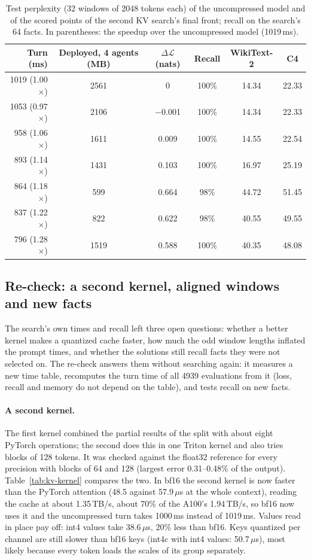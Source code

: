 \documentclass[11pt]{article}
\newcommand{\dloss}{\Delta\mathcal{L}}
\newcommand{\us}{\,$\mu$s}
\begin{document}
\begin{table}[htbp]
\centering
\small
\begin{tabular}{rccccc}
\toprule
Turn (ms) & Deployed, 4 agents (MB) & $\dloss$ (nats) & Recall & WikiText-2 & C4 \\
\midrule
 1019 (1.00$\times$) & 2561 & 0       & 100\% & 14.34 & 22.33 \\
\midrule
 1053 (0.97$\times$) & 2106 & $-$0.001 & 100\% & 14.34 & 22.33 \\
 958 (1.06$\times$) & 1611 & 0.009   & 100\% & 14.55 & 22.54 \\
 893 (1.14$\times$) & 1431 & 0.103   & 100\% & 16.97 & 25.19 \\
 864 (1.18$\times$) &  599 & 0.664   & 98\%  & 44.72 & 51.45 \\
 837 (1.22$\times$) &  822 & 0.622   & 98\%  & 40.55 & 49.55 \\
 796 (1.28$\times$) & 1519 & 0.588   & 100\% & 40.35 & 48.08 \\
\bottomrule
\end{tabular}
\caption{Test perplexity (32 windows of 2048 tokens each) of the uncompressed model and of the scored points
of the second KV search's final front; recall on the search's 64 facts. In parentheses: the speedup over the uncompressed model (1019\,ms).}
\label{tab:kv2-test}
\end{table}

\subsection{Re-check: a second kernel, aligned windows and new facts}
\label{sec:kv-recheck}
The search's own times and recall left three open questions: whether a better kernel makes a quantized
cache faster, how much the odd window lengths inflated the prompt times, and whether the solutions still
recall facts they were not selected on. The re-check answers them without searching again: it measures a
new time table, recomputes the turn time of all 4939 evaluations from it (loss, recall and memory do not
depend on the table), and tests recall on new facts.

\paragraph{A second kernel.} The first kernel combined the partial results of the split with about eight
PyTorch operations; the second does this in one Triton kernel and also tries blocks of 128 tokens. It was
checked against the float32 reference for every precision with blocks of 64 and 128 (largest error
0.31--0.48\% of the output). Table~\ref{tab:kv-kernel} compares the two. In bf16 the second kernel is now
faster than the PyTorch attention (48.5 against 57.9\us{} at the whole context), reading the cache at about
1.35\,TB/s, about 70\% of the A100's 1.94\,TB/s, so bf16 now uses it and the uncompressed turn takes 1000\,ms
instead of 1019\,ms. Values read in place pay off: int4 values take 38.6\us, 20\% less than bf16. Keys
quantized per channel are still slower than bf16 keys (int4c with int4 values: 50.7\us), most likely
because every token loads the scales of its group separately.
\end{document}
